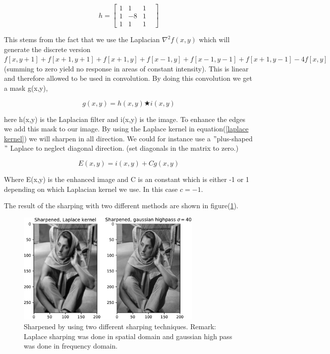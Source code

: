 {\begin{equation}
    h = \begin{bmatrix}
        1 & 1 & 1 & \\
        1 & -8 & 1\\
        1 & 1 & 1
    \end{bmatrix}
    \label{laplace kernel}
\end{equation}

This stems from the fact that we use the Laplacian $\nabla^2 f(x,y)$ which will generate the discrete version $f[x,y+1] + f[x+1,y+1] + f[x+1,y] + f[x-1,y] + f[x-1,y-1] + f[x+1,y-1] - 4f[x,y]$(summing to zero yield no response in areas of constant intensity). This is linear and therefore allowed to be used in convolution. By doing this convolution we get a mask g(x,y),

\begin{figure}[!htb]
    \begin{equation}
        g(x,y) = h(x,y) \bigstar i(x,y)
    \end{equation}
    \end{figure}

here h(x,y) is the Laplacian filter and i(x,y) is the image. To enhance the edges we add this mask to our image. By using the Laplace kernel in equation(\ref{laplace kernel}) we will sharpen in all direction. We could for instance use a $"$plus-shaped$"$ Laplace to neglect diagonal direction. (set diagonals in the matrix to zero.)

\begin{figure}[!htb]
    \begin{equation}
        E(x,y) = i(x,y) + Cg(x,y)
    \end{equation}
    \end{figure}
Where E(x,y) is the enhanced image and C is an constant which is either -1 or 1 depending on which Laplacian kernel we use. In this case $c = -1$.

The result of the sharping with two different methods are shown in figure(\ref{sharpened}).

\begin{figure}[!htb]
    {\centering
        \includegraphics[width=0.80\textwidth]{sharpened.pdf}
        \caption{Sharpened by using two different sharping techniques. Remark: Laplace sharping was done in spatial domain and gaussian high pass was done in frequency domain.}
        \label{sharpened}
    \par}
    \end{figure}

}
